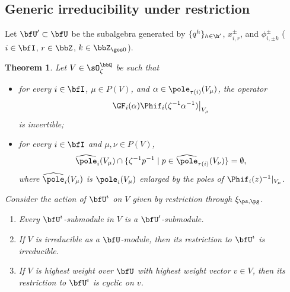 \documentclass[reqno]{amsart}
\numberwithin{equation}{section}
\newtheorem*{theorem}{Theorem}
\begin{document}
\subsection{Generic irreducibility under restriction}
\label{ss:generic-irr-restriction}
Let $\bfU'\subset\bfU$ be the subalgebra generated by $\{q^h\}_{h\in\h'}$, $x_{i,r}^\pm$, and $\phi^\pm_{i,\pm k}$ ($i\in\bfI$, $r\in\bbZ$, $k\in\bbZ_{\ges 0}$).
\begin{theorem}\label{thm:generic-submodules-cyclicity-restriction}
Let $V\in\sO^\bbQ_\zeta$ be such that
\begin{itemize}[leftmargin=3em]\itemsep0.25cm
\item for every $i\in\bfI$, $\mu\in P(V)$, and
$\alpha\in\pole_{\tau(i)}(V_\mu)$, the operator
\begin{equation}\label{eq:generic-invertibility-GPhi}
	\GF_i(\alpha)\Phif_i(\zeta^{-1}\alpha^{-1})\big|_{V_\mu}
\end{equation}
is invertible;
\item 
for every $i\in\bfI$ and $\mu,\nu\in P(V)$,
\begin{equation}\label{eq:generic-Cartan-separation}
	\widehat{\pole}_i(V_\mu)\cap
	\{\zeta^{-1}p^{-1}\mid
	p\in\widehat{\pole}_{\tau(i)}(V_\nu)\}=\emptyset,
\end{equation}
where $\widehat{\pole}_i(V_\mu)$ is $\pole_i(V_\mu)$ enlarged by
the poles of $\Phif_i(z)^{-1}|_{V_\mu}$.
\end{itemize}
Consider the action of $\bfU^\imath$ on $V$ given by restriction through $\xi_{\ps,\pg}$.
\begin{enumerate}[leftmargin=3em]\itemsep0.25cm
\item Every $\bfU^\imath$-submodule in $V$ is a
$\bfU'$-submodule. 
\item If $V$ is irreducible as a $\bfU$-module, then its
restriction to $\bfU^\imath$ is irreducible.
\item If $V$ is highest weight over $\bfU$ with highest weight vector $v\in V$, then
its restriction to $\bfU^\imath$ is cyclic on $v$.
\end{enumerate}
\end{theorem}
\end{document}

